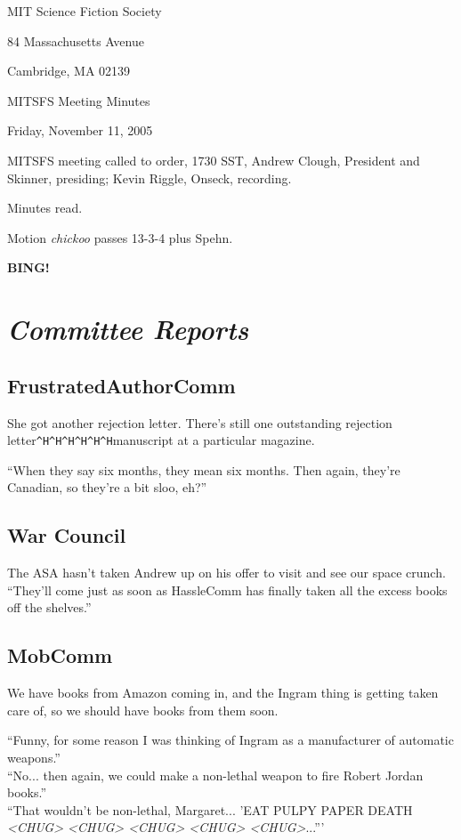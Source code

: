 \documentclass[10pt]{article}
\newcommand{\bing}{{\bf BING!} }
\newcommand{\goto}[1]{\bing \vskip 12pt \section*{{\em{#1}}}}
\newcommand{\ps}{ plus Spehn\xspace}
\begin{document}
\begin{center}

MIT Science Fiction Society

84 Massachusetts Avenue

Cambridge, MA 02139

\vspace{12pt}

MITSFS Meeting Minutes

Friday, November 11, 2005

\end{center}

\vspace{18pt}

\setlength{\parskip}{6pt}

\noindent
MITSFS meeting called to order, 1730 SST, Andrew Clough, President and 
Skinner, presiding; Kevin Riggle,  Onseck, recording.

Minutes read.

Motion \emph{chickoo} passes 13-3-4\ps.

\goto{Committee Reports}
\subsection*{FrustratedAuthorComm}
She got another rejection letter.  There's still one outstanding rejection 
letter{\tt ^H^H^H^H^H^H}manuscript at a particular magazine.  

``When they say six months, they mean six months.  Then again, they're Canadian, so they're a
bit sloo, eh?''

\subsection*{War Council}
The ASA hasn't taken Andrew up on his offer to visit and see our space crunch.  ``They'll come just
as soon as HassleComm has finally taken all the excess books off the shelves.''

\subsection*{MobComm}
We have books from Amazon coming in, and the Ingram thing is getting taken care of, so we should
have books from them soon.

``Funny, for some reason I was thinking of Ingram as a manufacturer of automatic weapons.'' \\
``No... then again, we could make a non-lethal weapon to fire Robert Jordan books.'' \\
``That wouldn't be non-lethal, Margaret...  'EAT PULPY PAPER DEATH \emph{<CHUG> <CHUG> <CHUG> <CHUG> <CHUG>}...'''
\end{document}
